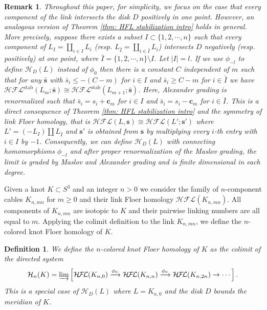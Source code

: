 \documentclass{amsart}
\newtheorem{remark}[theorem]{Remark}
\newtheorem{definition}[theorem]{Definition}
\newcommand{\CH}{\mathcal{H}}
\newcommand{\cHFL}{\mathcal{H\!F\! L}}
\newcommand{\HD}{\mathcal{H}}
\newcommand{\cc}{\mathbf{c}}
\newcommand{\stab}{\mathrm{stab}}
\renewcommand{\ss}{\mathbf{s}}
\begin{document}
\begin{remark}\label{rmk:orientation}
Throughout this paper, for simplicity, we focus on the case that every component of the link intersects the disk $D$ positively in one point. However, an analogous version of Theorem \ref{thm: HFL stabilization intro} holds in general. More precisely, suppose there exists a subset $I\subset\{1,2,\cdots,n\}$ such that every component of $L_I=\amalg_{i\in I}L_i$ (resp. $L_{\bar{I}}=\amalg_{i\in \bar{I}}L_i$) intersects $D$ negatively (resp. positively) at one point, where $\bar{I}=\{1,2,\cdots,n\}\setminus I$. Let $|I|=l$. If we use $\phi_{-l}$ to define $\HD_{D}(L)$ instead of $\phi_0$ then there is a constant $C$ independent of $m$ such that for any $\bar{\ss}$ with $\bar{s}_i\le -(C-m)$ for $i\in I$ and $\bar{s}_i\ge C-m$ for $i\in\bar{I}$ we have $\cHFL^{\stab}(L_{m};\bar{\ss})\cong\cHFL^{\stab}(L_{m+1};\bar{\ss})$. Here, Alexander grading is renormalized such that $\bar{s}_i=s_i+\cc_m$ for $i\in I$ and $\bar{s}_{i}=s_i-\cc_m$ for $i\in\bar{I}$. This is a direct consequence of Theorem \ref{thm: HFL stabilization intro} and the symmetry of link Floer homology, that is $\cHFL(L,\ss)\cong\cHFL(L';\ss')$ where $L'=(-L_{I})\amalg L_{\bar{I}}$ and $\ss'$ is obtained from $\ss$ by multiplying every $i$-th entry with $i\in I$ by $-1$. Consequently, we can define $\HD_{D}(L)$ with connecting homomorphisms $\phi_{-l}$ and after proper renormalization of the Maslov grading, the limit is graded by Maslov and Alexander grading and is finite dimensional in each degree.
\end{remark}










Given a knot $K\subset S^3$ and an integer $n>0$ we consider the family of $n$-component cables $K_{n,mn}$ for $m\ge 0$ and their link Floer homology $\cHFL(K_{n,mn})$. All components of $K_{n,mn}$ are isotopic to $K$ and their pairwise linking numbers are all equal to $m$. Applying the colimit definition to the link $K_{n, mn}$, we define the $n$-colored knot Floer homology of $K$. 


\begin{definition}
\label{def: colored homology intro}
We define the $n$-colored knot Floer homology of $K$ as the colimit of the directed system
\begin{equation}
\label{eq: colored def intro}
\CH_{n}(K)=\varinjlim\left[\cHFL(K_{n,0})\xrightarrow{\phi_0}\cHFL(K_{n,n})\xrightarrow{\phi_0}\cHFL(K_{n,2n})\to\cdots\right].
\end{equation}
This is a special case of $\HD_D(L)$ where $L=K_{n,0}$ and the disk $D$ bounds the meridian of $K$.
\end{definition}
\end{document}
